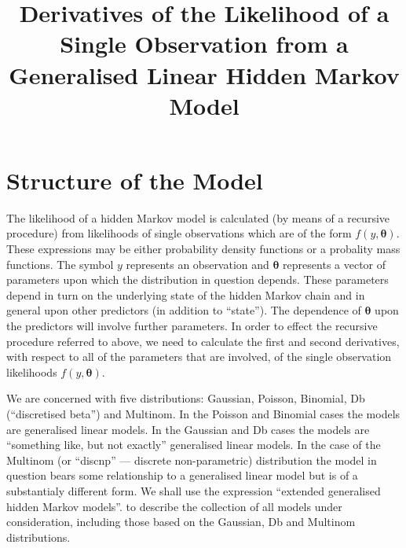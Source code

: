 
\usepackage{amsmath}
\newcommand{\btheta}{\mbox{$\boldsymbol{\theta}$}}
\newcommand{\bphi}{\mbox{$\boldsymbol{\phi}$}}
\newcommand{\bpsi}{\mbox{$\boldsymbol{\psi}$}}
\newcommand{\bsigma}{\mbox{$\boldsymbol{\sigma}$}}
\newcommand{\bdelta}{\mbox{$\boldsymbol{\delta}$}}
\newcommand{\bPhi}{\mbox{$\boldsymbol{\Phi}$}}
\newcommand{\brho}{\mbox{$\boldsymbol{\rho}$}}
\newcommand{\bx}{\mbox{$\boldsymbol{x}$}}
\newcommand{\bzero}{\mbox{$\boldsymbol{0}$}}
\newcommand{\ntop}{\mbox{$n_{\textup{\textrm{top}}}$}}
\newcommand{\nbot}{\mbox{$n_{\textup{\textrm{bot}}}$}}
\title{\textbf{Derivatives of the Likelihood of a Single Observation
from a Generalised Linear Hidden Markov Model}}
\author{}
\date{}

\maketitle
\section{Structure of the Model}
The likelihood of a hidden Markov model is calculated (by means
of a recursive procedure) from likelihoods of single observations
which are of the form $f(y,\btheta)$.  These expressions  may be
either probability density functions or a probality mass functions.
The symbol $y$ represents an observation and $\btheta$ represents a
vector of parameters upon which the distribution in question depends.
These parameters depend in turn on the underlying state of the hidden
Markov chain and in general upon other predictors (in addition to
``state'').  The dependence of $\btheta$ upon the predictors will
involve further parameters.  In order to effect the recursive
procedure referred to above, we need to calculate the first and
second derivatives, with respect to all of the parameters that are
involved, of the single observation likelihoods $f(y,\btheta)$.

We are concerned with five distributions: Gaussian, Poisson,
Binomial, Db (``discretised beta'') and Multinom.  In the Poisson and Binomial cases
the models are generalised linear models.  In the Gaussian and
Db cases the models are ``something like, but not exactly''
generalised linear models.  In the case of the Multinom (or
``discnp'' --- discrete non-parametric) distribution the model in
question bears some relationship to a generalised linear model but
is of a substantialy different form.  We shall use the expression
``extended generalised hidden Markov models''.  to describe the
collection of all models under consideration, including those based
on the Gaussian, Db and Multinom distributions.

